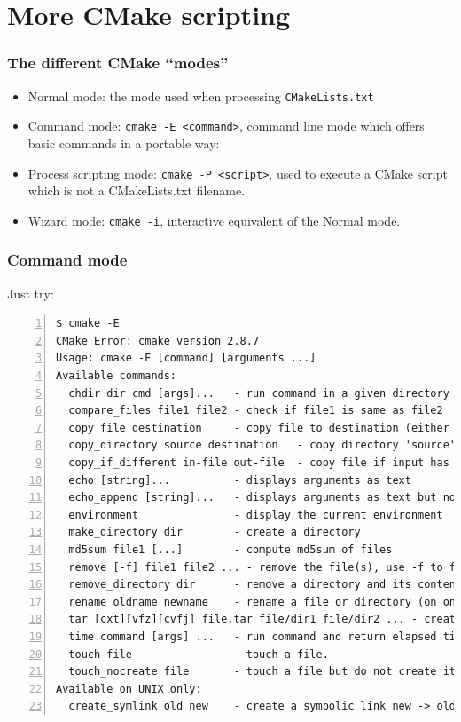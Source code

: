 \documentclass[compress,slidestop,table
              ]
               {beamer}
\newcommand{\fname}[1]{\texttt{#1}}
\begin{document}
\section{More CMake scripting}
\begin{frame}[fragile]
\frametitle{The different CMake ``modes''}
\begin{itemize}
\item Normal mode: the mode used when processing \fname{CMakeLists.txt}
\item Command mode: \fname{cmake -E <command>}, command line mode
      which offers basic commands in a portable way:

\item Process scripting mode: \fname{cmake -P <script>}, used to execute
      a CMake script which is not a CMakeLists.txt filename.

\item Wizard mode: \fname{cmake -i}, interactive equivalent of the Normal mode.
\end{itemize}
\end{frame}

\begin{frame}[fragile]
\frametitle{Command mode}
Just try:
\begin{Verbatim}[commandchars=\\\{\},fontsize=\tiny,numbers=left,frame=topline,label=list of command mode commands]
$ cmake -E
CMake Error: cmake version 2.8.7
Usage: cmake -E [command] [arguments ...]
Available commands: 
  chdir dir cmd [args]...   - run command in a given directory
  compare_files file1 file2 - check if file1 is same as file2
  copy file destination     - copy file to destination (either file or directory)
  copy_directory source destination   - copy directory 'source' content to directory 'destination'
  copy_if_different in-file out-file  - copy file if input has changed
  echo [string]...          - displays arguments as text
  echo_append [string]...   - displays arguments as text but no new line
  environment               - display the current environment
  make_directory dir        - create a directory
  md5sum file1 [...]        - compute md5sum of files
  remove [-f] file1 file2 ... - remove the file(s), use -f to force it
  remove_directory dir      - remove a directory and its contents
  rename oldname newname    - rename a file or directory (on one volume)
  tar [cxt][vfz][cvfj] file.tar file/dir1 file/dir2 ... - create a tar archive
  time command [args] ...   - run command and return elapsed time
  touch file                - touch a file.
  touch_nocreate file       - touch a file but do not create it.
Available on UNIX only:
  create_symlink old new    - create a symbolic link new -> old
\end{Verbatim}
\end{frame}
\end{document}
